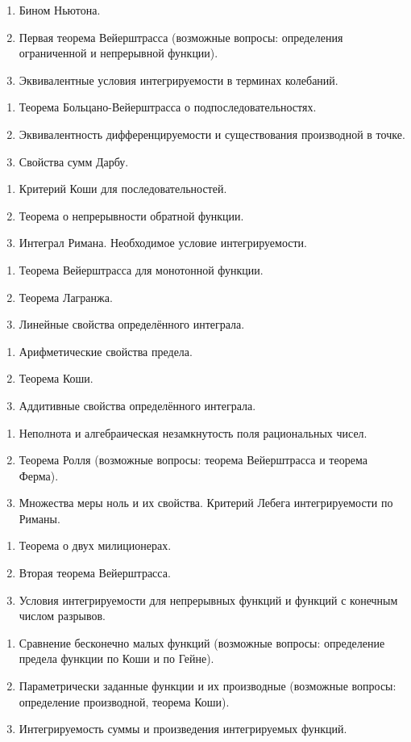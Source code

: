 \documentclass{article}
\newcounter{ticket}[subsection]
\newenvironment{ticket}[1][]{\item[Билет \ifthenelse{\equal{#1}{}}{}{\setcounter{ticket}{#1}}\theticket\refstepcounter{ticket}:]\phantom{}\begin{enumerate}}{\end{enumerate}}
\begin{document}
\begin{description}
	\begin{ticket}
		\item Бином Ньютона.
		\item Первая теорема Вейерштрасса (возможные вопросы: определения ограниченной и непрерывной функции).
		\item Эквивалентные условия интегрируемости в терминах колебаний.
	\end{ticket}
	\begin{ticket}
		\item Теорема Больцано-Вейерштрасса о подпоследовательностях.
		\item Эквивалентность дифференцируемости и существования производной в точке.
		\item Свойства сумм Дарбу.
	\end{ticket}
	\begin{ticket}
		\item Критерий Коши для последовательностей.
		\item Теорема о непрерывности обратной функции.
		\item Интеграл Римана. Необходимое условие интегрируемости.
	\end{ticket}
	\begin{ticket}
		\item Теорема Вейерштрасса для монотонной функции.
		\item Теорема Лагранжа.
		\item Линейные свойства определённого интеграла.
	\end{ticket}
	\begin{ticket}
		\item Арифметические свойства предела.
		\item Теорема Коши.
		\item Аддитивные свойства определённого интеграла.
	\end{ticket}
	\begin{ticket}
		\item Неполнота и алгебраическая незамкнутость поля рациональных чисел.
		\item Теорема Ролля (возможные вопросы: теорема Вейерштрасса и теорема Ферма).
		\item Множества меры ноль и их свойства. Критерий Лебега интегрируемости по Риманы.
	\end{ticket}
	\begin{ticket}
		\item Теорема о двух милиционерах.
		\item Вторая теорема Вейерштрасса.
		\item Условия интегрируемости для непрерывных функций и функций с конечным числом разрывов.
	\end{ticket}
	\begin{ticket}
		\item Сравнение бесконечно малых функций (возможные вопросы: определение предела функции по Коши и по Гейне).
		\item Параметрически заданные функции и их производные (возможные вопросы: определение производной, теорема Коши).
		\item Интегрируемость суммы и произведения интегрируемых функций.
	\end{ticket}
\end{description}
\end{document}
